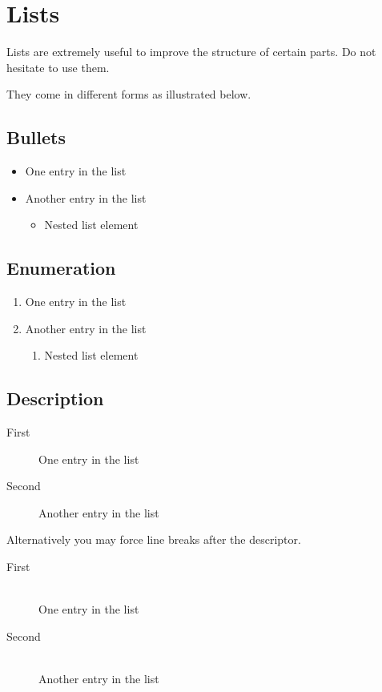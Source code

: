 \documentclass[parskip=half]{scrbook}
\begin{document}
\section{Lists}

Lists are extremely useful to improve the structure of certain parts.
Do not hesitate to use them.

They come in different forms as illustrated below.

\subsection{Bullets}

\begin{itemize}
	\item One entry in the list
	\item Another entry in the list
	      \begin{itemize}
		      \item Nested list element
	      \end{itemize}
\end{itemize}

\subsection{Enumeration}

\begin{enumerate}
	\item One entry in the list
	\item Another entry in the list
	      \begin{enumerate}
		      \item Nested list element
	      \end{enumerate}
\end{enumerate}

\subsection{Description}

\begin{description}
	\item[First] One entry in the list
	\item[Second] Another entry in the list
\end{description}

Alternatively you may force line breaks after the descriptor.

\begin{description}
	\item[First]\hfill\\
	      One entry in the list
	\item[Second]\hfill\\
	      Another entry in the list
\end{description}
\end{document}
